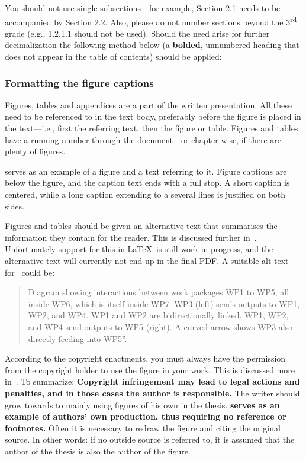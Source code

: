 You should not use single subsections---for example, Section 2.1 needs to be accompanied by Section 2.2. Also, please do not number sections beyond the 3\textsuperscript{rd}  grade (e.g., 1.2.1.1 should not be used). Should the need arise for further decimalization the following method below (a \textbf{bolded}, unnumbered heading that does not appear in the table of contents) should be applied:

\subsubsection{Formatting the figure captions} Figures, tables and appendices are a part of the written presentation. All these need to be referenced to in the text body, preferably before the figure is placed in the text---i.e., first the referring text, then the figure or table. Figures and tables have a running number through the document---or chapter wise, if there are plenty of figures.

 serves as an example of a figure and a text referring to it. Figure captions are below the figure, and the caption text ends with a full stop. A short caption is centered, while a long caption extending to a several lines is justified on both sides.

Figures and tables should be given an alternative text that summarises
the information they contain for the reader. This is discussed further
in~. Unfortunately support for this in \LaTeX\ is still work in progress, and the alternative text will currently not end up in the final PDF. A suitable alt text for~ could be:
\begin{quote}
  Diagram showing interactions between work packages WP1 to WP5, all inside WP6, which is itself inside WP7. WP3 (left) sends outputs to WP1, WP2, and WP4. WP1 and WP2 are bidirectionally linked. WP1, WP2, and WP4 send outputs to WP5 (right). A curved arrow shows WP3 also directly feeding into WP5''.
\end{quote} 

According to the copyright enactments, you must always have the permission from the copyright holder to use the figure in your work. This is discussed more in~. To summarize: \textbf{Copyright infringement may lead to legal actions and penalties, and in those cases the author is responsible.} The writer should grow towards to mainly using figures of his own in the thesis. \textbf{  serves as an example of authors' own production, thus requiring no reference or footnotes.}  Often it is necessary to redraw the figure and citing the original source. In other words: if no outside source is referred to, it is assumed that the author of the thesis is also the author of the figure.

